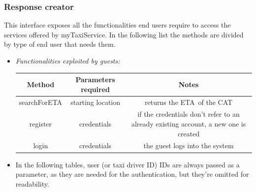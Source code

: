 \documentclass{article}
\begin{document}
\subsubsection{Response creator}
This interface exposes all the functionalities end users require to access the services offered by myTaxiService. 
In the following list the methods are divided by type of end user that needs them. 
\begin{itemize}
	\item \textit{Functionalities exploited by guests:}	\\
	\begin{table}[H]
		\begin{adjustbox}{width=1.2\textwidth}
			\begin{tabular}{*{3}{c}}
				\toprule
				Method & Parameters required & Notes \\
				\midrule
				searchForETA & starting location & returns the ETA\footnotemark\  of the CAT\footnotemark\\ %
				register & credentials & if the credentials don't refer to an already existing account, a new one is created \\
				login & credentials & the guest logs into the system \\
				\bottomrule
			\end{tabular}
	\end{adjustbox}
\end{table}

	\item In the following tables, user (or taxi driver ID) IDs are always passed as a parameter, as they are needed for the authentication, but they're omitted for readability. \\	


\end{itemize}
\end{document}
